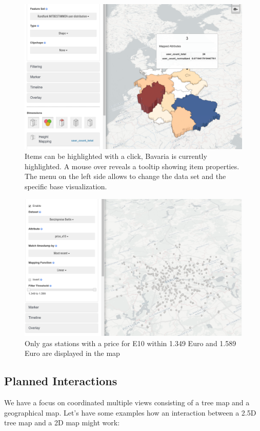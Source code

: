 \documentclass{article}
\newcommand{\map}{\textsc{2D} map}
\newcommand{\tmap}{\textsc{2.5D} tree map}
\begin{document}
\begin{figure}[h!]
  \centering
  \includegraphics[width=\textwidth]{images/existing-interactions.png}
  \caption{%
    Items can be highlighted with a click, Bavaria is currently highlighted.
    A mouse over reveals a tooltip showing item properties.
    The menu on the left side allows to change the data set and the specific base visualization.
  }\label{fig:analysis:interaction:existing}
\end{figure}

\begin{figure}[h!]
  \centering
  \includegraphics[width=\textwidth]{images/existing-interactions-filter.png}
  \caption{%
    Only gas stations with a price for E10 within 1.349 Euro and 1.589 Euro are displayed in the map
  }\label{fig:analysis:interaction:existing:filter}
\end{figure}

\subsection{Planned Interactions}
We have a focus on coordinated multiple views consisting of a tree map and a geographical map.
Let's have some examples how an interaction between a \tmap{} and a \map{} might work:
\end{document}
